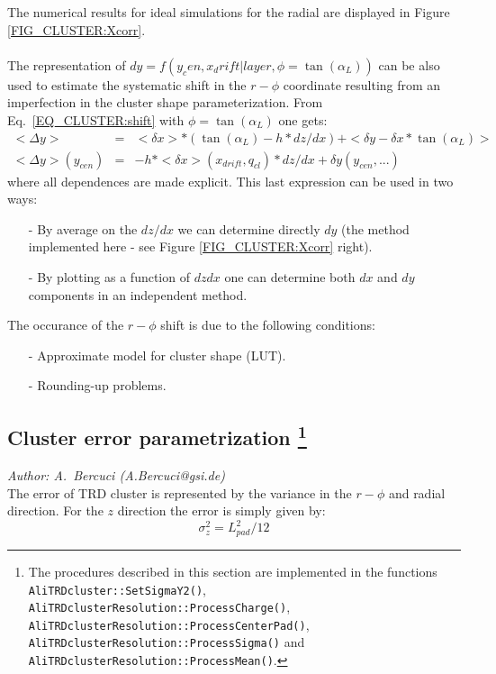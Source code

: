 \documentclass{alicetdr}
\begin{document}
The numerical results for ideal simulations for the radial are displayed in 
Figure \ref{FIG_CLUSTER:Xcorr}.
\\
\\
The representation of $dy=f(y_cen, x_drift| layer, \phi=\tan(\alpha_L))$ can be 
also used to estimate the systematic shift in the $r-\phi$ coordinate resulting 
from an imperfection in the cluster shape parameterization. From 
Eq.~\ref{EQ_CLUSTER:shift} with $\phi=\tan(\alpha_L)$ one gets: 
\begin{eqnarray}
<\Delta y>&=& <\delta x> * (\tan(\alpha_{L})-h*dz/dx) + <\delta y - \delta x * \tan(\alpha_{L})>\\
<\Delta y>(y_{cen})&=& -h*<\delta x>(x_{drift}, q_{cl}) * dz/dx + \delta y(y_{cen}, ...)
\end{eqnarray}
where all dependences are made explicit. This last expression can be used in two ways:
\begin{itemize}
  \item[-] By average on the $dz/dx$ we can determine directly $dy$ (the method 
           implemented here - see Figure \ref{FIG_CLUSTER:Xcorr} right).
  \item[-] By plotting as a function of $dzdx$ one can determine both $dx$ and $dy$ 
           components in an independent method.
\end{itemize}
The occurance of the $r-\phi$ shift is due to the following conditions:
\begin{itemize}
  \item[-] Approximate model for cluster shape (LUT).
  \item[-] Rounding-up problems.
\end{itemize}


\subsection[Cluster error parameterization]{Cluster error parametrization
\footnote{The procedures described in this section are implemented in the functions 
{\tt AliTRDcluster::SetSigmaY2()}, {\tt AliTRDclusterResolution::ProcessCharge()}, 
{\tt AliTRDclusterResolution::ProcessCenterPad()}, 
{\tt AliTRDclusterResolution::ProcessSigma()} and 
{\tt AliTRDclusterResolution::ProcessMean()}.}}\label{REC:CL:error}
{\it Author: A.~Bercuci (A.Bercuci@gsi.de)}
\\

The error of TRD cluster is represented by the variance in the $r-\phi$ and radial 
direction. For the $z$ direction the error is simply given by:
\begin{equation}
\sigma^2_z=L^2_{pad}/12
\end{equation}
\end{document}
